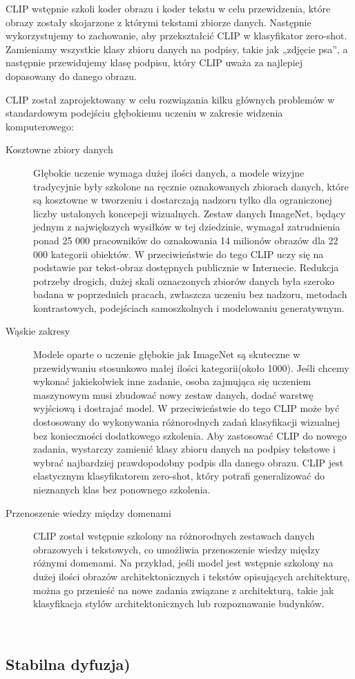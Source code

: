     CLIP wstępnie szkoli koder obrazu i koder tekstu w celu przewidzenia, które obrazy zostały skojarzone z którymi tekstami zbiorze danych.
    Następnie wykorzystujemy to zachowanie, aby przekształcić CLIP w klasyfikator zero-shot.
    Zamieniamy wszystkie klasy zbioru danych na podpisy, takie jak „zdjęcie psa”, a następnie przewidujemy klasę podpisu, który CLIP uważa za najlepiej dopasowany do danego obrazu.

    CLIP został zaprojektowany w celu rozwiązania kilku głównych problemów w standardowym podejściu głębokiemu uczeniu w zakresie widzenia komputerowego:

    \begin{description}

        \item[Kosztowne zbiory danych] Głębokie uczenie wymaga dużej ilości danych, a modele wizyjne tradycyjnie były szkolone na ręcznie oznakowanych zbiorach danych, które są kosztowne w tworzeniu i dostarczają nadzoru tylko dla ograniczonej liczby ustalonych koncepcji wizualnych. Zestaw danych ImageNet, będący jednym z największych wysiłków w tej dziedzinie, wymagał zatrudnienia ponad 25 000 pracowników do oznakowania 14 milionów obrazów dla 22 000 kategorii obiektów. W przeciwieństwie do tego CLIP uczy się na podstawie par tekst-obraz dostępnych publicznie w Internecie. Redukcja potrzeby drogich, dużej skali oznaczonych zbiorów danych była szeroko badana w poprzednich pracach, zwłaszcza uczeniu bez nadzoru, metodach kontrastowych, podejściach samoszkolnych i modelowaniu generatywnym.

        \item[Wąskie zakresy] Modele oparte o uczenie głębokie jak ImageNet są skuteczne w przewidywaniu stosunkowo małej ilości kategorii(około 1000).
        Jeśli chcemy wykonać jakiekolwiek inne zadanie, osoba zajmująca się uczeniem maszynowym musi zbudować nowy zestaw danych, dodać warstwę wyjściową i dostrajać model.
        W przeciwieństwie do tego CLIP może być dostosowany do wykonywania różnorodnych zadań klasyfikacji wizualnej bez konieczności dodatkowego szkolenia.
        Aby zastosować CLIP do nowego zadania, wystarczy zamienić klasy zbioru danych na podpisy tekstowe i wybrać najbardziej prawdopodobny podpis dla danego obrazu.
        CLIP jest elastycznym klasyfikatorem zero-shot, który potrafi generalizować do nieznanych klas bez ponownego szkolenia.

        \item[Przenoszenie wiedzy między domenami] CLIP został wstępnie szkolony na różnorodnych zestawach danych obrazowych i tekstowych, co umożliwia przenoszenie wiedzy między różnymi domenami.
        Na przykład, jeśli model jest wstępnie szkolony na dużej ilości obrazów architektonicznych i tekstów opisujących architekturę, można go przenieść na nowe zadania związane z architekturą, takie jak klasyfikacja stylów architektonicznych lub rozpoznawanie budynków.

    \end{description}~\subsection{Stabilna dyfuzja)}

